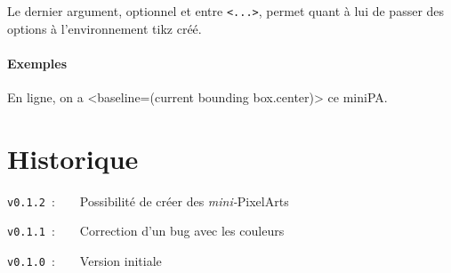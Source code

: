 \documentclass{article}
\begin{document}
Le dernier argument, optionnel et entre \texttt{<...>}, permet quant à lui de passer des options à l'environnement \textsf{tikz} créé.

\subsection{Exemples}

\begin{PresentationCode}{}
\end{PresentationCode}

\begin{PresentationCode}{}
En ligne, on a <baseline=(current bounding box.center)> ce miniPA.
\end{PresentationCode}

\pagebreak

\part{Historique}

\verb|v0.1.2|~:~~~~Possibilité de créer des \textit{mini-}PixelArts

\verb|v0.1.1|~:~~~~Correction d'un bug avec les couleurs

\verb|v0.1.0|~:~~~~Version initiale
\end{document}
